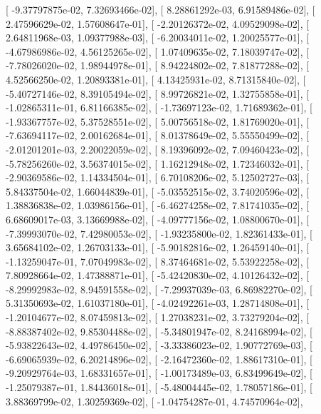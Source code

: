 \documentclass{article}
\begin{document}
       [ -9.37797875e-02,   7.32693466e-02],
       [  8.28861292e-03,   6.91589486e-02],
       [  2.47596629e-02,   1.57608647e-01],
       [ -2.20126372e-02,   4.09529098e-02],
       [  2.64811968e-03,   1.09377988e-03],
       [ -6.20034011e-02,   1.20025577e-01],
       [ -4.67986986e-02,   4.56125265e-02],
       [  1.07409635e-02,   7.18039747e-02],
       [ -7.78026020e-02,   1.98944978e-01],
       [  8.94224802e-02,   7.81877288e-02],
       [  4.52566250e-02,   1.20893381e-01],
       [  4.13425931e-02,   8.71315840e-02],
       [ -5.40727146e-02,   8.39105494e-02],
       [  8.99726821e-02,   1.32755858e-01],
       [ -1.02865311e-01,   6.81166385e-02],
       [ -1.73697123e-02,   1.71689362e-01],
       [ -1.93367757e-02,   5.37528551e-02],
       [  5.00756518e-02,   1.81769020e-01],
       [ -7.63694117e-02,   2.00162684e-01],
       [  8.01378649e-02,   5.55550499e-02],
       [ -2.01201201e-03,   2.20022059e-02],
       [  8.19396092e-02,   7.09460423e-02],
       [ -5.78256260e-02,   3.56374015e-02],
       [  1.16212948e-02,   1.72346032e-01],
       [ -2.90369586e-02,   1.14334504e-01],
       [  6.70108206e-02,   5.12502727e-03],
       [  5.84337504e-02,   1.66044839e-01],
       [ -5.03552515e-02,   3.74020596e-02],
       [  1.38836838e-02,   1.03986156e-01],
       [ -6.46274258e-02,   7.81741035e-02],
       [  6.68609017e-03,   3.13669988e-02],
       [ -4.09777156e-02,   1.08800670e-01],
       [ -7.39993070e-02,   7.42980053e-02],
       [ -1.93235800e-02,   1.82361433e-01],
       [  3.65684102e-02,   1.26703133e-01],
       [ -5.90182816e-02,   1.26459140e-01],
       [ -1.13259047e-01,   7.07049983e-02],
       [  8.37464681e-02,   5.53922258e-02],
       [  7.80928664e-02,   1.47388871e-01],
       [ -5.42420830e-02,   4.10126432e-02],
       [ -8.29992983e-02,   8.94591558e-02],
       [ -7.29937039e-03,   6.86982270e-02],
       [  5.31350693e-02,   1.61037180e-01],
       [ -4.02492261e-03,   1.28714808e-01],
       [ -1.20104677e-02,   8.07459813e-02],
       [  1.27038231e-02,   3.73279204e-02],
       [ -8.88387402e-02,   9.85304488e-02],
       [ -5.34801947e-02,   8.24168994e-02],
       [ -5.93822643e-02,   4.49786450e-02],
       [ -3.33386023e-02,   1.90772769e-03],
       [ -6.69065939e-02,   6.20214896e-02],
       [ -2.16472360e-02,   1.88617310e-01],
       [ -9.20929764e-03,   1.68331657e-01],
       [ -1.00173489e-03,   6.83499649e-02],
       [ -1.25079387e-01,   1.84436018e-01],
       [ -5.48004445e-02,   1.78057186e-01],
       [  3.88369799e-02,   1.30259369e-02],
       [ -1.04754287e-01,   4.74570964e-02],
\end{document}
